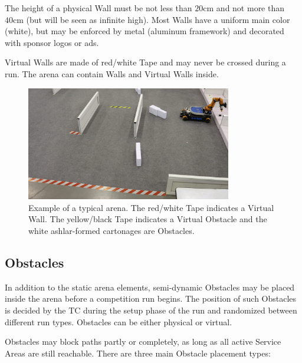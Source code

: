 The height of a physical Wall must be not less than $20\si{\centi\meter}$ and not more than $40\si{\centi\meter}$ (but will be seen as infinite high). Most Walls have a uniform main color (white), but may be enforced by metal (aluminum framework) and decorated with sponsor logos or ads.

Virtual Walls are made of red/white Tape and may never be crossed during a run. The arena can contain Walls and Virtual Walls inside.

\begin{figure} [h!]
\centering
\includegraphics[width= 0.8\textwidth ]{./images/general_rules/barrier_tapes_in_china15.jpg}
\caption{Example of a typical arena. The red/white Tape indicates a Virtual Wall. The yellow/black Tape indicates a Virtual Obstacle and the white ashlar-formed cartonages are Obstacles.}
\label{fig:walls_and_virt_walls}
\end{figure}

\subsection{Obstacles}
\label{subsec: Obstacles}

In addition to the static arena elements, semi-dynamic Obstacles may be placed inside the arena before a competition run begins. 
The position of such Obstacles is decided by the TC during the setup phase of the run and randomized between different run types. Obstacles can be either physical or virtual.

Obstacles may block paths partly or completely, as long as all active Service Areas are still reachable.
There are three main Obstacle placement types:

